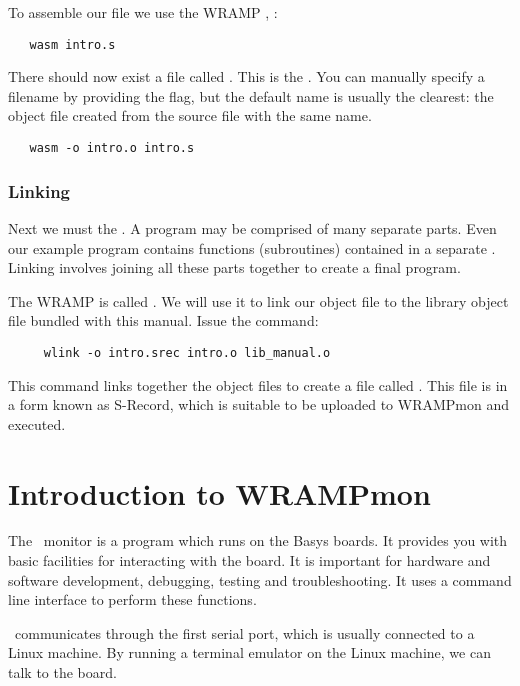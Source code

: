 To assemble our file we use the WRAMP , :
\begin{verbatim}
   wasm intro.s
\end{verbatim}

There should now exist a file called . This is the 
. You can manually specify a filename by providing the
 flag, but the default name is usually the clearest: the
object file created from the source file with the same name.

\begin{verbatim}
   wasm -o intro.o intro.s
\end{verbatim}

\subsubsection{Linking}
Next we must  the . A program may be
comprised of many separate parts. Even our example program contains
functions (subroutines) contained in a separate . Linking
involves joining all these parts together to create a final program.

The WRAMP  is called . We will use it to
link our object file to the library object file bundled with this manual.
Issue the command:
\begin{verbatim}
     wlink -o intro.srec intro.o lib_manual.o
\end{verbatim}

This command links together the object files to create a file called
. This file is in a form known as S-Record, which
is suitable to be uploaded to WRAMPmon and executed.

%
%
%
\section{Introduction to WRAMPmon}
\label{intro:wrampmon}

The \WRAMPmon\ monitor is a program which runs on the Basys boards. It
provides you with basic facilities for interacting with the board.
It is important for hardware and software development, debugging,
testing and troubleshooting. It uses a command line interface to
perform these functions.

\WRAMPmon\ communicates through the first serial port, which is usually
connected to a Linux machine.
By running a terminal emulator on the Linux machine, we can talk to the board.

